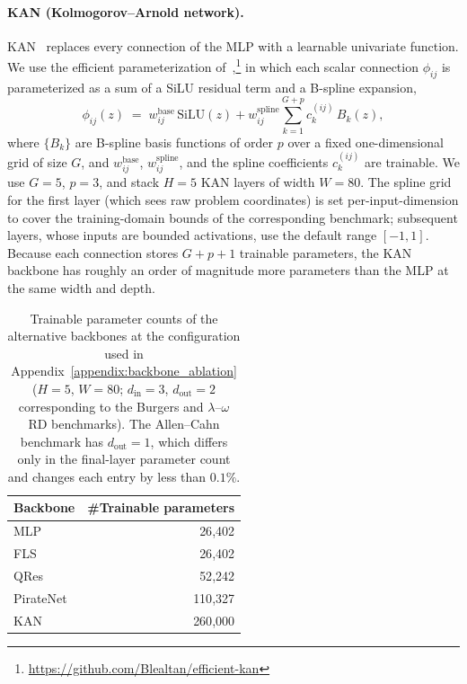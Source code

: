 \documentclass{article}
\theoremstyle{plain}
\theoremstyle{definition}
\theoremstyle{remark}
\begin{document}
\paragraph{KAN (Kolmogorov--Arnold network).}
KAN~\cite{Liu2024KAN} replaces every connection of the MLP with a learnable
univariate function. We use the efficient parameterization
of~\citet{Liu2024KAN},\footnote{\url{https://github.com/Blealtan/efficient-kan}}
in which each scalar connection $\phi_{ij}$ is parameterized as a sum of a
SiLU residual term and a B-spline expansion,
\begin{equation}
    \phi_{ij}(z) \;=\;
    w^{\mathrm{base}}_{ij}\,\mathrm{SiLU}(z) +
    w^{\mathrm{spline}}_{ij} \sum_{k=1}^{G+p} c^{(ij)}_{k}\, B_k(z),
\end{equation}
where $\{B_k\}$ are B-spline basis functions of order $p$ over a fixed
one-dimensional grid of size $G$, and
$w^{\mathrm{base}}_{ij}$, $w^{\mathrm{spline}}_{ij}$, and the spline
coefficients $c^{(ij)}_{k}$ are trainable. We use $G=5$, $p=3$, and stack
$H=5$ KAN layers of width $W=80$. The spline grid for the first layer
(which sees raw problem coordinates) is set per-input-dimension to cover the
training-domain bounds of the corresponding benchmark; subsequent layers,
whose inputs are bounded activations, use the default range $[-1,1]$.
Because each connection stores $G+p+1$ trainable parameters, the KAN backbone
has roughly an order of magnitude more parameters than the MLP at the same
width and depth.

\begin{sc}
\begin{table}[h]
\centering
\small
\caption{Trainable parameter counts of the alternative backbones at the
configuration used in Appendix~\ref{appendix:backbone_ablation}
($H=5$, $W=80$; $d_\mathrm{in}=3$, $d_\mathrm{out}=2$ corresponding to the
Burgers and $\lambda$--$\omega$ RD benchmarks).
The Allen--Cahn benchmark has $d_\mathrm{out}=1$, which differs only in the
final-layer parameter count and changes each entry by less than $0.1\%$.}
\label{tab:backbone_params}
\setlength{\tabcolsep}{12pt}
\begin{tabular}{lr}
\toprule
Backbone & \#Trainable parameters \\
\midrule
MLP        & 26{,}402  \\
FLS    & 26{,}402  \\
QRes       & 52{,}242  \\
PirateNet  & 110{,}327 \\
KAN        & 260{,}000 \\
\bottomrule
\end{tabular}
\end{table}
\end{sc}
\end{document}

